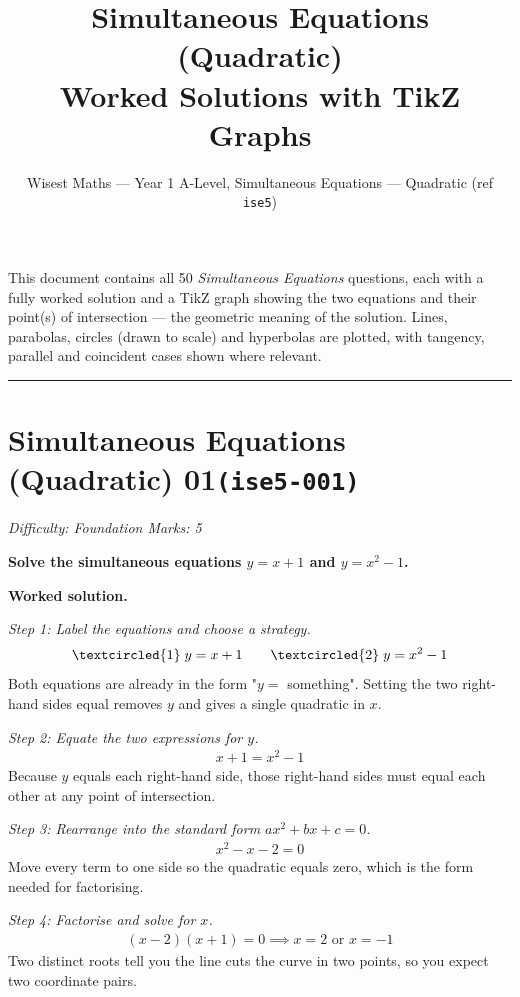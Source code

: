 \documentclass[11pt]{article}
\title{\textbf{Simultaneous Equations (Quadratic)}\\[0.3em]\large Worked Solutions with TikZ Graphs}
\author{Wisest Maths --- Year 1 A-Level, Simultaneous Equations --- Quadratic (ref \texttt{ise5})}
\date{}
\newcommand{\question}[1]{\par\medskip\noindent\textbf{#1}\par}
\begin{document}
\maketitle
\noindent This document contains all 50 \emph{Simultaneous Equations} questions, each with a
fully worked solution and a TikZ graph showing the two equations and their point(s) of intersection --- the
geometric meaning of the solution. Lines, parabolas, circles (drawn to scale) and hyperbolas are plotted, with
tangency, parallel and coincident cases shown where relevant.
\tableofcontents
\bigskip
\hrule

\section*{Simultaneous Equations (Quadratic) 01\quad\small\texttt{(ise5-001)}}
\textit{Difficulty: Foundation \quad\textbar\quad Marks: 5}

\question{Solve the simultaneous equations \( y = x + 1 \) and \( y = x^2 - 1 \).}

\textbf{Worked solution.}

\textit{Step 1: Label the equations and choose a strategy.}
\[\begin{gathered}
\textcircled{1}\; y = x + 1 \qquad \textcircled{2}\; y = x^2 - 1
\end{gathered}\]
Both equations are already in the form "\( y = \) something". Setting the two right-hand sides equal removes \( y \) and gives a single quadratic in \( x \).

\textit{Step 2: Equate the two expressions for \( y \).}
\[\begin{gathered}
x + 1 = x^2 - 1
\end{gathered}\]
Because \( y \) equals each right-hand side, those right-hand sides must equal each other at any point of intersection.

\textit{Step 3: Rearrange into the standard form \( ax^2 + bx + c = 0 \).}
\[\begin{gathered}
x^2 - x - 2 = 0
\end{gathered}\]
Move every term to one side so the quadratic equals zero, which is the form needed for factorising.

\textit{Step 4: Factorise and solve for \( x \).}
\[\begin{gathered}
(x - 2)(x + 1) = 0 \implies x = 2 \text{ or } x = -1
\end{gathered}\]
Two distinct roots tell you the line cuts the curve in two points, so you expect two coordinate pairs.
\end{document}
